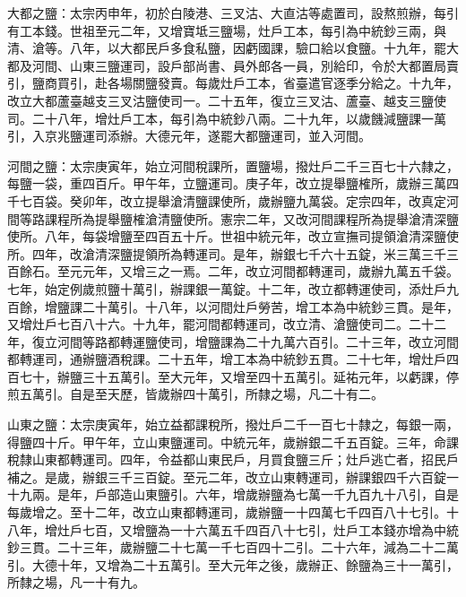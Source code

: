 \begin{pinyinscope}
 大都之鹽：太宗丙申年，初於白陵港、三叉沽、大直沽等處置司，設熬煎辦，每引有工本錢。世祖至元二年，又增寶坻三鹽場，灶戶工本，每引為中統鈔三兩，與清、滄等。八年，以大都民戶多食私鹽，因虧國課，驗口給以食鹽。十九年，罷大都及河間、山東三鹽運司，設戶部尚書、員外郎各一員，別給印，令於大都置局賣引，鹽商買引，赴各場關鹽發賣。每歲灶戶工本，省臺遣官逐季分給之。十九年，改立大都蘆臺越支三叉沽鹽使司一。二十五年，復立三叉沽、蘆臺、越支三鹽使司。二十八年，增灶戶工本，每引為中統鈔八兩。二十九年，以歲饑減鹽課一萬引，入京兆鹽運司添辦。大德元年，遂罷大都鹽運司，並入河間。



 河間之鹽：太宗庚寅年，始立河間稅課所，置鹽場，撥灶戶二千三百七十六隸之，每鹽一袋，重四百斤。甲午年，立鹽運司。庚子年，改立提舉鹽榷所，歲辦三萬四千七百袋。癸卯年，改立提舉滄清鹽課使所，歲辦鹽九萬袋。定宗四年，改真定河間等路課程所為提舉鹽榷滄清鹽使所。憲宗二年，又改河間課程所為提舉滄清深鹽使所。八年，每袋增鹽至四百五十斤。世祖中統元年，改立宣撫司提領滄清深鹽使所。四年，改滄清深鹽提領所為轉運司。是年，辦銀七千六十五錠，米三萬三千三百餘石。至元元年，又增三之一焉。二年，改立河間都轉運司，歲辦九萬五千袋。七年，始定例歲煎鹽十萬引，辦課銀一萬錠。十二年，改立都轉運使司，添灶戶九百餘，增鹽課二十萬引。十八年，以河間灶戶勞苦，增工本為中統鈔三貫。是年，又增灶戶七百八十六。十九年，罷河間都轉運司，改立清、滄鹽使司二。二十二年，復立河間等路都轉運鹽使司，增鹽課為二十九萬六百引。二十三年，改立河間都轉運司，通辦鹽酒稅課。二十五年，增工本為中統鈔五貫。二十七年，增灶戶四百七十，辦鹽三十五萬引。至大元年，又增至四十五萬引。延祐元年，以虧課，停煎五萬引。自是至天歷，皆歲辦四十萬引，所隸之場，凡二十有二。



 山東之鹽：太宗庚寅年，始立益都課稅所，撥灶戶二千一百七十隸之，每銀一兩，得鹽四十斤。甲午年，立山東鹽運司。中統元年，歲辦銀二千五百錠。三年，命課稅隸山東都轉運司。四年，令益都山東民戶，月買食鹽三斤；灶戶逃亡者，招民戶補之。是歲，辦銀三千三百錠。至元二年，改立山東轉運司，辦課銀四千六百錠一十九兩。是年，戶部造山東鹽引。六年，增歲辦鹽為七萬一千九百九十八引，自是每歲增之。至十二年，改立山東都轉運司，歲辦鹽一十四萬七千四百八十七引。十八年，增灶戶七百，又增鹽為一十六萬五千四百八十七引，灶戶工本錢亦增為中統鈔三貫。二十三年，歲辦鹽二十七萬一千七百四十二引。二十六年，減為二十二萬引。大德十年，又增為二十五萬引。至大元年之後，歲辦正、餘鹽為三十一萬引，所隸之場，凡一十有九。




\end{pinyinscope}
